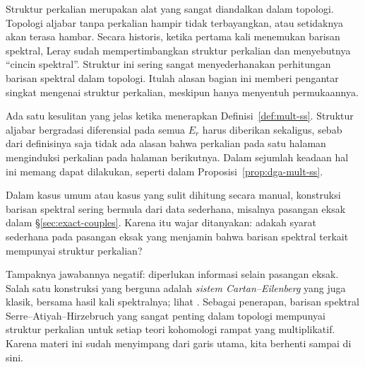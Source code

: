 \begin{remark}
	Struktur perkalian merupakan alat yang sangat diandalkan dalam topologi.
	Topologi aljabar tanpa perkalian hampir tidak terbayangkan, atau setidaknya
	akan terasa hambar. Secara historis, ketika pertama kali menemukan barisan
	spektral, Leray sudah mempertimbangkan struktur perkalian dan menyebutnya
	``cincin spektral''. Struktur ini sering sangat menyederhanakan perhitungan
	barisan spektral dalam topologi. Itulah alasan bagian ini memberi pengantar
	singkat mengenai struktur perkalian, meskipun hanya menyentuh permukaannya.

	Ada satu kesulitan yang jelas ketika menerapkan
	Definisi~\ref{def:mult-ss}. Struktur aljabar bergradasi diferensial pada
	semua $E_r$ harus diberikan sekaligus, sebab dari definisinya saja tidak ada
	alasan bahwa perkalian pada satu halaman menginduksi perkalian pada halaman
	berikutnya. Dalam sejumlah keadaan hal ini memang dapat dilakukan, seperti
	dalam Proposisi~\ref{prop:dga-mult-ss}.

	Dalam kasus umum atau kasus yang sulit dihitung secara manual, konstruksi
	barisan spektral sering bermula dari data sederhana, misalnya pasangan eksak
dalam \S\ref{sec:exact-couples}. Karena itu wajar ditanyakan: adakah syarat
sederhana pada pasangan eksak yang menjamin bahwa barisan spektral terkait
mempunyai struktur perkalian?

	Tampaknya jawabannya negatif: diperlukan informasi selain pasangan eksak.
Salah satu konstruksi yang berguna adalah \emph{sistem Cartan--Eilenberg} yang
juga klasik, bersama hasil kali spektralnya; lihat \cite[II.A]{Dou58}. Sebagai
penerapan, barisan spektral Serre--Atiyah--Hirzebruch yang sangat penting dalam
topologi mempunyai struktur perkalian untuk setiap teori kohomologi rampat
yang multiplikatif. Karena materi ini sudah menyimpang dari garis utama, kita
berhenti sampai di sini.
\end{remark}
